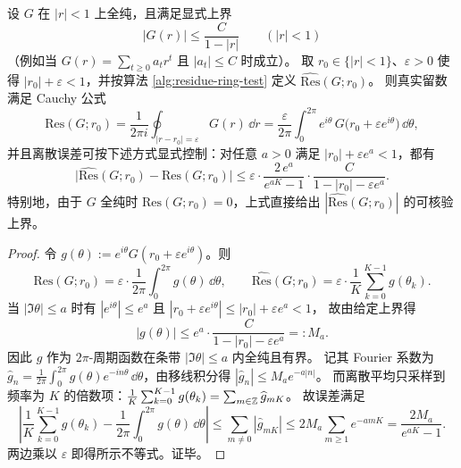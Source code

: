\begin{proposition}[离散留数估计的显式误差界]\label{prop:residue-ring-explicit-error-bound}
设 $G$ 在 $|r|<1$ 上全纯，且满足显式上界
$$
|G(r)|\le \frac{C}{1-|r|}\qquad(|r|<1)
$$
（例如当 $G(r)=\sum_{t\ge 0}a_t r^t$ 且 $|a_t|\le C$ 时成立）。
取 $r_0\in\{|r|<1\}$、$\varepsilon>0$ 使得 $|r_0|+\varepsilon<1$，并按算法 \ref{alg:residue-ring-test} 定义 $\widehat{\mathrm{Res}}(G;r_0)$。
则真实留数满足 Cauchy 公式
$$
\mathrm{Res}(G;r_0)=\frac{1}{2\pi i}\oint_{|r-r_0|=\varepsilon}G(r)\,\dd r
=\frac{\varepsilon}{2\pi}\int_0^{2\pi} e^{i\theta}\,G\!\bigl(r_0+\varepsilon e^{i\theta}\bigr)\,\dd\theta,
$$
并且离散误差可按下述方式显式控制：对任意 $a>0$ 满足 $|r_0|+\varepsilon e^{a}<1$，都有
$$
\bigl|\widehat{\mathrm{Res}}(G;r_0)-\mathrm{Res}(G;r_0)\bigr|
\le
\varepsilon\cdot
\frac{2\,e^{a}}{e^{aK}-1}\cdot
\frac{C}{1-|r_0|-\varepsilon e^{a}}.
$$
特别地，由于 $G$ 全纯时 $\mathrm{Res}(G;r_0)=0$，上式直接给出 $|\widehat{\mathrm{Res}}(G;r_0)|$ 的可核验上界。
\end{proposition}
\begin{proof}
令 $g(\theta):=e^{i\theta}G(r_0+\varepsilon e^{i\theta})$。则
$$
\mathrm{Res}(G;r_0)=\varepsilon\cdot \frac{1}{2\pi}\int_0^{2\pi}g(\theta)\,\dd\theta,
\qquad
\widehat{\mathrm{Res}}(G;r_0)=\varepsilon\cdot \frac{1}{K}\sum_{k=0}^{K-1}g(\theta_k).
$$
当 $|\Im\theta|\le a$ 时有 $|e^{i\theta}|\le e^{a}$ 且
$
|r_0+\varepsilon e^{i\theta}|\le |r_0|+\varepsilon e^{a}<1
$，
故由给定上界得
$$
|g(\theta)|\le e^{a}\cdot \frac{C}{1-|r_0|-\varepsilon e^{a}}=:M_a.
$$
因此 $g$ 作为 $2\pi$-周期函数在条带 $|\Im\theta|\le a$ 内全纯且有界。
记其 Fourier 系数为 $\widehat g_n=\frac{1}{2\pi}\int_0^{2\pi} g(\theta)e^{-in\theta}\,\dd\theta$，由移线积分得
$
|\widehat g_n|\le M_a e^{-a|n|}
$。
而离散平均只采样到频率为 $K$ 的倍数项：$\frac{1}{K}\sum_{k=0}^{K-1} g(\theta_k)=\sum_{m\in\mathbb{Z}}\widehat g_{mK}$。
故误差满足
$$
\left|
\frac{1}{K}\sum_{k=0}^{K-1} g(\theta_k)
-\frac{1}{2\pi}\int_0^{2\pi}g(\theta)\,\dd\theta
\right|
\le
\sum_{m\ne 0}|\widehat g_{mK}|
\le
2M_a\sum_{m\ge 1}e^{-amK}
=\frac{2M_a}{e^{aK}-1}.
$$
两边乘以 $\varepsilon$ 即得所示不等式。证毕。
\end{proof}

